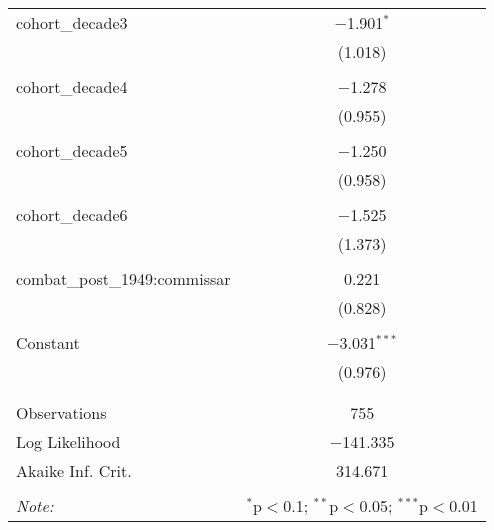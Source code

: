 \documentclass[12pt,letterpaper]{article}
\begin{document}
\begin{table}[!htbp]
\begin{tabular}{@{\extracolsep{5pt}}lc}
		cohort\_decade3 & $-$1.901$^{*}$ \\ 
		& (1.018) \\ 
		& \\ 
		cohort\_decade4 & $-$1.278 \\ 
		& (0.955) \\ 
		& \\ 
		cohort\_decade5 & $-$1.250 \\ 
		& (0.958) \\ 
		& \\ 
		cohort\_decade6 & $-$1.525 \\ 
		& (1.373) \\ 
		& \\ 
		combat\_post\_1949:commissar & 0.221 \\ 
		& (0.828) \\ 
		& \\ 
		Constant & $-$3.031$^{***}$ \\ 
		& (0.976) \\ 
		& \\ 
		\hline \\[-1.8ex] 
		Observations & 755 \\ 
		Log Likelihood & $-$141.335 \\ 
		Akaike Inf. Crit. & 314.671 \\ 
		\hline 
		\hline \\[-1.8ex] 
		\textit{Note:}  & \multicolumn{1}{r}{$^{*}$p$<$0.1; $^{**}$p$<$0.05; $^{***}$p$<$0.01} \\ 
	\end{tabular} 
\end{table} 
\end{document}
